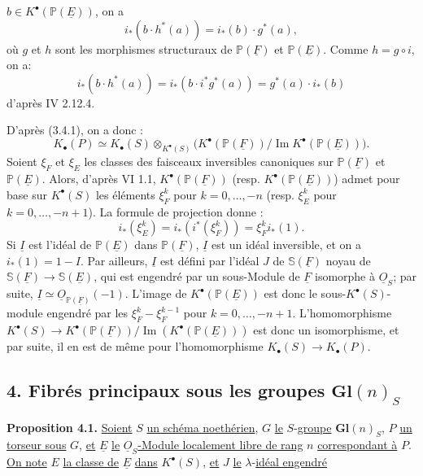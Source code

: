 
$b\in K^{\bullet}(\mathbb P(\underline{E}))$, on a
\[
i_*(b\cdot h^*(a))=i_*(b)\cdot g^*(a),
\]
où $g$ et $h$
sont les morphismes structuraux de $\mathbb P(\underline{F})$ et $\mathbb P(\underline{E})$. Comme $h=g\circ i$, on a:
\[
i_*(b\cdot h^*(a))=i_*(b\cdot i^*g^*(a))=g^*(a)\cdot i_*(b)
\]
d'après IV 2.12.4.

D'après (3.4.1), on a donc :
\[
K_\bullet(P)\simeq K_\bullet(S)\otimes_{K^{\bullet}(S)}
\bigl(K^{\bullet}(\mathbb P(\underline{F}))/\operatorname{Im}K^{\bullet}(\mathbb P(\underline{E}))\bigr).
\]
Soient $\xi_F$ et $\xi_E$ les classes des faisceaux inversibles canoniques sur $\mathbb P(\underline{F})$ et $\mathbb P(\underline{E})$. Alors, d'après VI 1.1, $K^{\bullet}(\mathbb P(\underline{F}))$ (resp. $K^{\bullet}(\mathbb P(\underline{E}))$) admet pour base sur $K^{\bullet}(S)$ les éléments $\xi_F^k$ pour $k=0,\ldots,-n$ (resp. $\xi_E^k$ pour $k=0,\ldots,-n+1$). La formule de projection donne :
\[
i_*(\xi_E^k)=i_*(i^*(\xi_F^k))=\xi_F^k i_*(1).
\]
Si $\underline{I}$ est l'idéal de $\mathbb P(\underline{E})$ dans $\mathbb P(\underline{F})$, $\underline{I}$ est un idéal inversible, et on a $i_*(1)=1-I$. Par ailleurs, $\underline{I}$ est défini par l'idéal $J$ de $\mathbb S(\underline{F})$ noyau de $\mathbb S(\underline{F})\to \mathbb S(\underline{E})$, qui est engendré par un sous-Module de $\underline{F}$ isomorphe à $\underline{O}_S$; par suite, $\underline{I}\simeq \underline{O}_{\mathbb P(\underline{F})}(-1)$. L'image de $K^{\bullet}(\mathbb P(\underline{E}))$ est donc le sous-$K^{\bullet}(S)$-module engendré par les $\xi_F^k-\xi_F^{k-1}$ pour $k=0,\ldots,-n+1$. L'homomorphisme $K^{\bullet}(S)\longrightarrow K^{\bullet}(\mathbb P(\underline{F}))/\operatorname{Im}(K^{\bullet}(\mathbb P(\underline{E})))$ est donc un isomorphisme, et par suite, il en est de même pour l'homomorphisme $K_\bullet(S)\to K_\bullet(P)$.

\subsection*{4. Fibrés principaux sous les groupes $\mathbf{Gl}(n)_S$}

\textbf{Proposition 4.1.} \uline{Soient} $S$ \uline{un schéma noethérien}, $G$ \uline{le} $S$-\uline{groupe} $\mathbf{Gl}(n)_S$, $P$ \uline{un torseur sous} $G$, \uline{et} $\underline{E}$ \uline{le} $\underline{O}_S$\uline{-Module localement libre de rang} $n$ \uline{correspondant à} $P$. \uline{On note} $E$ \uline{la classe de} $\underline{E}$ \uline{dans} $K^{\bullet}(S)$, \uline{et} $J$ \uline{le} $\lambda$-\uline{idéal engendré}

